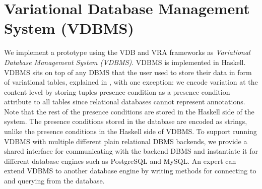 \chapter{Variational Database Management System (VDBMS)}
\label{ch:vdbms}

%
We implement a prototype using the VDB and VRA frameworks as
\emph{Variational Database Management System (VDBMS)}.
VDBMS is implemented in Haskell. VDBMS sits on 
top of any DBMS that the user used to store their data 
in form of variational tables, explained in , with one exception:
we encode variation at the content level by storing tuples presence condition 
as a presence condition attribute to all tables
since relational databases cannot represent annotations. 
Note that the rest of the presence conditions are stored in the Haskell side of the system.
The presence conditions stored in the database are encoded as strings, unlike 
the presence conditions in the Haskell side of VDBMS.
To support running VDBMS with multiple different plain relational DBMS backends,
we provide
a shared interface
for communicating with the backend DBMS and
instantiate it for different database engines such as PostgreSQL and
MySQL. 
An expert can extend VDBMS to another database engine by
writing methods for connecting to and querying from the database.

%

%




